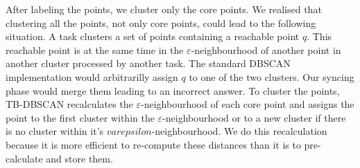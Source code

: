 \documentclass[10pt,journal,compsoc]{IEEEtran}
\let\MYoriglatexcaption\caption
\renewcommand{\caption}[2][\relax]{\MYoriglatexcaption[#2]{#2}}
\begin{document}
% 
% 

After labeling the points, we cluster only the core points. We realised that clustering all the points, not only core points, could lead to the following situation. A task clusters a set of points containing a reachable point $q$. This reachable point is at the same time in the $\varepsilon$-neighbourhood of another point in another cluster processed by another task. The standard DBSCAN implementation \cite{original-paper} would arbitrarilly assign $q$ to one of the two clusters. Our syncing phase would merge them leading to an incorrect answer. To cluster the points, TB-DBSCAN recalculates the $\varepsilon$-neighbourhood of each core point and assigns the point to the first cluster within the $\varepsilon$-neighbourhood or to a new cluster if there is no cluster within it's $varepsilon$-neighbourhood. We do this recalculation because it is more efficient to re-compute these distances than it is to pre-calculate and store them.
\end{document}
